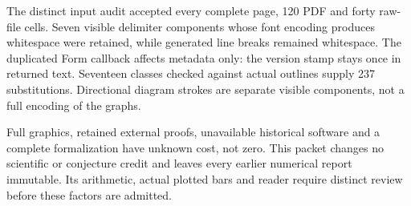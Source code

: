 \documentclass[11pt,a4paper]{article}
\begin{document}
The distinct input audit accepted every complete page, 120 PDF and forty raw-file cells. Seven visible delimiter components whose font encoding produces whitespace were retained, while generated line breaks remained whitespace. The duplicated Form callback affects metadata only: the version stamp stays once in returned text. Seventeen classes checked against actual outlines supply 237 substitutions. Directional diagram strokes are separate visible components, not a full encoding of the graphs.

Full graphics, retained external proofs, unavailable historical software and a complete formalization have unknown cost, not zero. This packet changes no scientific or conjecture credit and leaves every earlier numerical report immutable. Its arithmetic, actual plotted bars and reader require distinct review before these factors are admitted.
\end{document}
